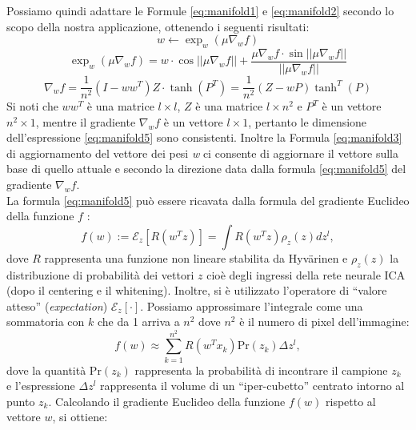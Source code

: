 \documentclass[final]{siamltex}
\begin{document}
{Possiamo quindi adattare le Formule \eqref{eq:manifold1} e \eqref{eq:manifold2} secondo lo scopo della nostra applicazione, ottenendo i seguenti risultati:
%
\begin{equation} 
\label{eq:manifold3}
w \leftarrow \exp_w(\mu \nabla_wf )
\end{equation}
%
\begin{equation} 
\label{eq:manifold4}
\exp_w(\mu \nabla_wf )=w\cdot \cos ||\mu \nabla_wf ||+ \frac{\mu \nabla_wf \cdot \sin ||\mu \nabla_wf ||}{||\mu \nabla_wf ||}
\end{equation}
%
\begin{equation} 
\label{eq:manifold5}
\nabla_wf = \frac{1}{n^2} \left(I - ww^T \right) Z \cdot \tanh \left(P^T\right) = \frac{1}{n^2} \left(Z - wP \right) \tanh ^T (P)
\end{equation}
%
Si noti che $ww^T$ \`{e} una matrice $l \times l$, $Z$  \`{e} una matrice $l \times n^2$ e $P^T$ \`{e} un vettore $n^2 \times 1$, mentre il gradiente $\nabla_wf$ \`{e} un vettore $l \times 1$, pertanto le dimensione dell'espressione \eqref{eq:manifold5} sono consistenti. Inoltre la Formula \eqref{eq:manifold3} di aggiornamento del vettore dei pesi \textit{w} ci consente di aggiornare il vettore sulla base di quello attuale e secondo la direzione data dalla formula \eqref{eq:manifold5} del gradiente $\nabla_wf $.\\
La formula \eqref{eq:manifold5} pu\`{o} essere ricavata dalla formula del gradiente Euclideo della funzione $f$ \cite{ICA}:
%
\begin{equation}
f(w) := \mathcal{E}_z[R(w^T z)] = \int R(w^T z) \rho_z(z)dz^{l},
\end{equation}
%
dove $R$ rappresenta una funzione non lineare stabilita da Hyv\"{a}rinen e $\rho_z(z)$ la distribuzione di probabilit\`{a} dei vettori $z$ cio\`{e} degli ingressi della rete neurale ICA (dopo il centering e il whitening). Inoltre, si \`{e} utilizzato l'operatore di ``valore atteso'' (\emph{expectation}) $\mathcal{E}_z[\cdot]$.
Possiamo approssimare l'integrale come una sommatoria con $k$ che da 1 arriva a $n^2$ dove $n^2$ \`{e} il numero di pixel dell'immagine:
%
\begin{equation}
f(w)\approx\sum_{k=1}^{n^2} R(w^T x_k) \mathrm{Pr}(z_k) \Delta z^{l},
\end{equation}
%
dove la quantit\`{a} $\mathrm{Pr}(z_k)$ rappresenta la probabilit\`{a} di incontrare il campione $z_k$ e l'espressione $\Delta z^{l}$ rappresenta il volume di un ``iper-cubetto'' centrato intorno al punto $z_k$.
Calcolando il gradiente Euclideo della funzione $f(w)$ rispetto al vettore $w$, si ottiene:
}
\end{document}
